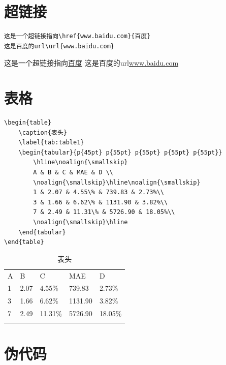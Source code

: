 \documentclass{article}
\begin{document}
	\section{超链接}
	\begin{lstlisting}
这是一个超链接指向\href{www.baidu.com}{百度}
这是百度的url\url{www.baidu.com}
	\end{lstlisting}
	这是一个超链接指向\href{www.baidu.com}{百度}
	这是百度的url\url{www.baidu.com}
	
	\section{表格}
	\begin{lstlisting}
\begin{table}
	\caption{表头}
	\label{tab:table1}
	\begin{tabular}{p{45pt} p{55pt} p{55pt} p{55pt} p{55pt}}
		\hline\noalign{\smallskip}
		A & B & C & MAE & D \\
		\noalign{\smallskip}\hline\noalign{\smallskip}
		1 & 2.07 & 4.55\% & 739.83 & 2.73%\\
		3 & 1.66 & 6.62\% & 1131.90 & 3.82%\\
		7 & 2.49 & 11.31\% & 5726.90 & 18.05%\\
		\noalign{\smallskip}\hline
	\end{tabular}
\end{table}
	\end{lstlisting}
	\begin{table}
		\caption{表头}
		\label{tab:table1}
		\begin{tabular}{p{45pt} p{55pt} p{55pt} p{55pt} p{55pt}}
			\hline\noalign{\smallskip}
			A & B & C & MAE & D \\
			\noalign{\smallskip}\hline\noalign{\smallskip}
			1 & 2.07 & 4.55\% & 739.83 & 2.73\%\\
			3 & 1.66 & 6.62\% & 1131.90 & 3.82\%\\
			7 & 2.49 & 11.31\% & 5726.90 & 18.05\%\\
			\noalign{\smallskip}\hline
		\end{tabular}
	\end{table}
	
	\section{伪代码}
	
\end{document}
